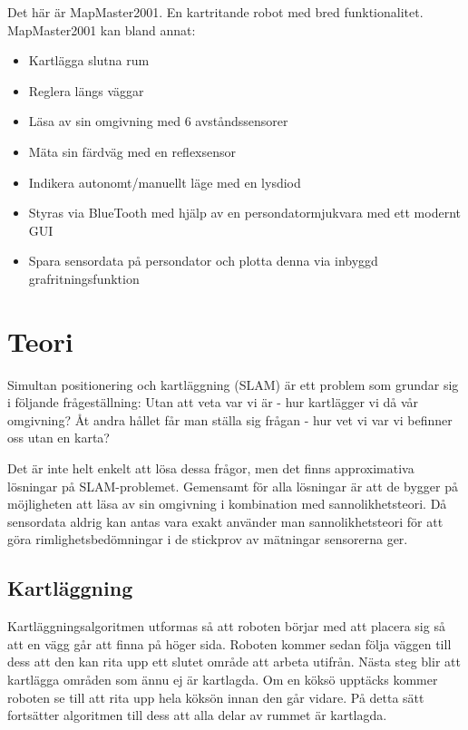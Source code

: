 \documentclass[a4paper,12pt,fleqn]{article}
\begin{document}
Det här är MapMaster2001. En kartritande robot med bred funktionalitet. MapMaster2001 kan bland annat: 

\begin{itemize}
  \item Kartlägga slutna rum
  \item Reglera längs väggar
  \item Läsa av sin omgivning med 6 avståndssensorer
  \item Mäta sin färdväg med en reflexsensor
  \item Indikera autonomt/manuellt läge med en lysdiod
  \item Styras via BlueTooth med hjälp av en persondatormjukvara med ett modernt GUI
  \item Spara sensordata på persondator och plotta denna via inbyggd grafritningsfunktion
\end{itemize}

\newpage
\section{Teori}
Simultan positionering och kartläggning (SLAM) är ett problem som grundar sig i följande frågeställning: Utan att veta var vi är - hur kartlägger vi då vår omgivning? Åt andra hållet får man ställa sig frågan - hur vet vi var vi befinner oss utan en karta?

Det är inte helt enkelt att lösa dessa frågor, men det finns approximativa lösningar på SLAM-problemet. Gemensamt för alla lösningar är att de bygger på möjligheten att läsa av sin omgivning i kombination med
sannolikhetsteori. Då sensordata aldrig kan antas vara exakt använder man sannolikhetsteori för att göra rimlighetsbedömningar i de stickprov av mätningar sensorerna ger.

\subsection{Kartläggning}


Kartläggningsalgoritmen utformas så att roboten börjar med att placera sig så att en vägg går att finna på höger sida. Roboten kommer sedan följa väggen till dess att den kan rita upp ett slutet område att arbeta utifrån. Nästa steg blir att kartlägga områden som ännu ej är kartlagda. Om en köksö upptäcks kommer roboten se till att rita upp hela köksön innan den går vidare. På detta sätt fortsätter algoritmen till dess att alla delar av rummet är kartlagda. 
\end{document}
